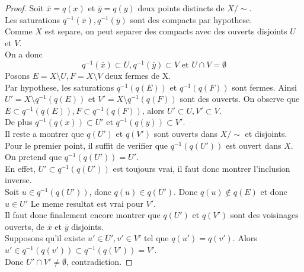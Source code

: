 \documentclass[../main.tex]{subfiles}
\begin{document}
\begin{proof}
Soit $ \overline{x}= q( x) $ et $\overline{y}=q( y) $ deux points distincts de $X /\sim$.\\
Les saturations $q^{-1}( \overline{x}) , q^{-1}( \overline{y}) $ sont des compacts par hypothese.\\
Comme $X$ est separe, on peut separer des compacts avec des ouverts disjoints $U$ et $V$.\\
On a donc
\[ 
q^{-1}( \overline{x}) \subset U, q^{-1}( \overline{y}) \subset V \text{ et } U\cap V= \emptyset
\]
Posons $E= X\setminus U, F= X\setminus V$ deux fermes de X.\\
Par hypothese, les saturations $q^{-1}( q( E) ) $ et $ q^{-1}( q( F) ) $ sont fermes. Ainsi $U' = X \setminus q^{-1}( q( E) ) $ et $V' = X \setminus q^{-1}( q( F) ) $ sont des ouverts. On observe que $ E \subset q^{-1}( q( E) ) , F \subset q^{-1}( q( F) ) $, alors $U' \subset U, V' \subset V$.\\
De plus $ q^{-1}( q( x) ) \subset U' $ et $ q^{-1}( q( y) ) \subset V'$.\\
Il reste a montrer que $ q( U') $ et $q( V') $ sont ouverts dans $X /\sim$ et disjoints. Pour le premier point, il suffit de verifier que $ q^{-1}( q( U') ) $ est ouvert dans $X$. On pretend que $q^{-1}( q( U') ) = U'$.\\
En effet, $U' \subset q^{-1}( q( U') ) $ est toujours vrai, il faut donc montrer l'inclusion inverse.\\
Soit $u \in q^{-1}( q( U') ) $, donc $q( u) \in q( U') $. Donc $q( u) \notin q( E) $ et donc $u \in U'$ 
Le meme resultat est vrai pour $V'$.\\

Il faut donc finalement encore montrer que $q( U') $ et $q( V') $ sont des voisinages ouverts, de $ \overline{x}$ et $ \overline{y}$ disjoints.\\
Supposons qu'il existe $u' \in U', v' \in V'$ tel que $q( u') = q( v') $. Alors $u' \in q^{-1}( q( v') ) \subset q^{-1}( q( V') ) = V'  $.\\
Donc $U' \cap V' \neq \emptyset$, contradiction.
\end{proof}
\end{document}
